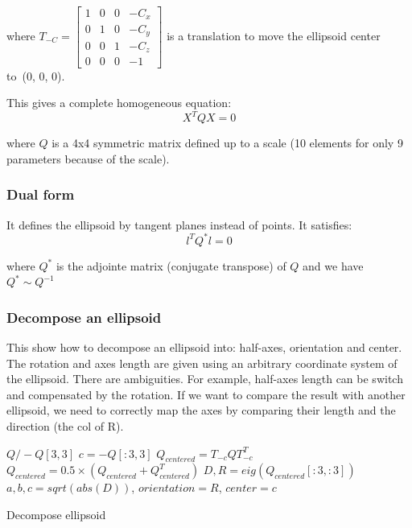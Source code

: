 where $T_{-C} = \left[\begin{array}{cccc}
    1&0&0&-C_x \\
    0&1&0&-C_y \\
    0&0&1&-C_z \\
    0&0&0&-1
    \end{array}\right]$ is a translation to move the ellipsoid center to~(0, 0, 0).

This gives a complete homogeneous equation:
\begin{equation}
    X^T Q X = 0
\end{equation}

where $Q$ is a 4x4 symmetric matrix defined up to a scale (10 elements for only 9 parameters because of the scale).

\subsubsection{Dual form}
It defines the ellipsoid by tangent planes instead of points. It satisfies:
\begin{equation}
    l^T Q^* l = 0
\end{equation}

where $Q^*$ is the adjointe matrix (conjugate transpose) of $Q$ and we have $Q^* \sim Q^{-1}$


\subsubsection{Decompose an ellipsoid}
This show how to decompose an ellipsoid into: half-axes, orientation and center. The rotation and axes length are given using an arbitrary coordinate system of the ellipsoid. There are ambiguities. For example, half-axes length can be switch and compensated by the rotation. If we want to compare the result with another ellipsoid, we need to correctly map the axes by comparing their length and the direction (the col of R).

\begin{algorithm}[H]
\DontPrintSemicolon
{}
 $Q/-Q[3, 3]$ 
 $c = -Q[:3, 3]$  
 $Q_{centered} = T_{-c} Q T_{-c}^T $ 
 $Q_{centered} = 0.5\times(Q_{centered}+Q_{centered}^T)$ 
 $D, R = eig(Q_{centered}[:3, :3])$ 
 $a, b, c = sqrt(abs(D))$, $orientation = R$, $center = c$
\caption{Decompose ellipsoid}
\end{algorithm}

